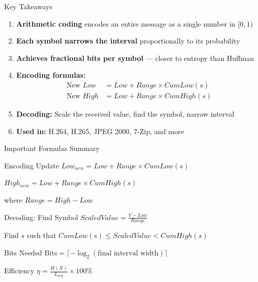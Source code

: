 \documentclass[aspectratio=169,12pt]{beamer}
\begin{document}
\begin{frame}{Key Takeaways}
    \begin{enumerate}
        \item \textbf{Arithmetic coding} encodes an entire message as a single number in $[0, 1)$
        
        \item \textbf{Each symbol narrows the interval} proportionally to its probability
        
        \item \textbf{Achieves fractional bits per symbol} --- closer to entropy than Huffman
        
        \item \textbf{Encoding formulas:}
        \begin{align*}
            \text{New } Low &= Low + Range \times CumLow(s) \\
            \text{New } High &= Low + Range \times CumHigh(s)
        \end{align*}
        
        \item \textbf{Decoding:} Scale the received value, find the symbol, narrow interval
        
        \item \textbf{Used in:} H.264, H.265, JPEG 2000, 7-Zip, and more
    \end{enumerate}
\end{frame}

\begin{frame}{Important Formulas Summary}
    \begin{block}{Encoding Update}
        $Low_{new} = Low + Range \times CumLow(s)$
        
        $High_{new} = Low + Range \times CumHigh(s)$
        
        where $Range = High - Low$
    \end{block}
    
    \begin{block}{Decoding: Find Symbol}
        $ScaledValue = \frac{V - Low}{Range}$
        
        Find $s$ such that $CumLow(s) \leq ScaledValue < CumHigh(s)$
    \end{block}
    
    \begin{block}{Bits Needed}
        $\text{Bits} = \lceil -\log_2(\text{final interval width}) \rceil$
    \end{block}
    
    \begin{block}{Efficiency}
        $\eta = \frac{H(X)}{L_{avg}} \times 100\%$
    \end{block}
\end{frame}
\end{document}

